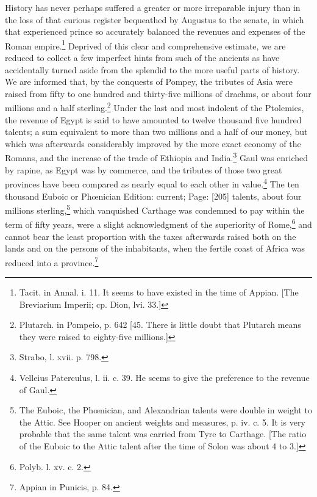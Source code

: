 History has never perhaps suffered a greater or more irreparable injury than in the loss of that curious register bequeathed by Augustus to the senate, in which that experienced prince so accurately balanced the revenues and expenses of the Roman empire.\footnote{Tacit. in Annal. i. 11. It seems to have existed in the time of Appian. [The Breviarium Imperii; cp. Dion, lvi. 33.]} Deprived of this clear and comprehensive estimate, we are reduced to collect a few imperfect hints from such of the ancients as have accidentally turned aside from the splendid to the more useful parts of history. We are informed that, by the conquests of Pompey, the tributes of Asia were raised from fifty to one hundred and thirty-five millions of drachms, or about four millions and a half sterling.\footnote{Plutarch. in Pompeio, p. 642 [45. There is little doubt that Plutarch means they were raised to eighty-five millions.]} Under the last and most indolent of the Ptolemies, the revenue of Egypt is said to have amounted to twelve thousand five hundred talents; a sum equivalent to more than two millions and a half of our money, but which was afterwards considerably improved by the more exact economy of the Romans, and the increase of the trade of Ethiopia and India.\footnote{Strabo, l. xvii. p. 798.} Gaul was enriched by rapine, as Egypt was by commerce, and the tributes of those two great provinces have been compared as nearly equal to each other in value.\footnote{Velleius Paterculus, l. ii. c. 39. He seems to give the preference to the revenue of Gaul.} The ten thousand Euboic or Phœnician Edition: current; Page: [205] talents, about four millions sterling,\footnote{The Euboic, the Phœnician, and Alexandrian talents were double in weight to the Attic. See Hooper on ancient weights and measures, p. iv. c. 5. It is very probable that the same talent was carried from Tyre to Carthage. [The ratio of the Euboic to the Attic talent after the time of Solon was about 4 to 3.]} which vanquished Carthage was condemned to pay within the term of fifty years, were a slight acknowledgment of the superiority of Rome,\footnote{Polyb. l. xv. c. 2.} and cannot bear the least proportion with the taxes afterwards raised both on the lands and on the persons of the inhabitants, when the fertile coast of Africa was reduced into a province.\footnote{Appian in Punicis, p. 84.}

